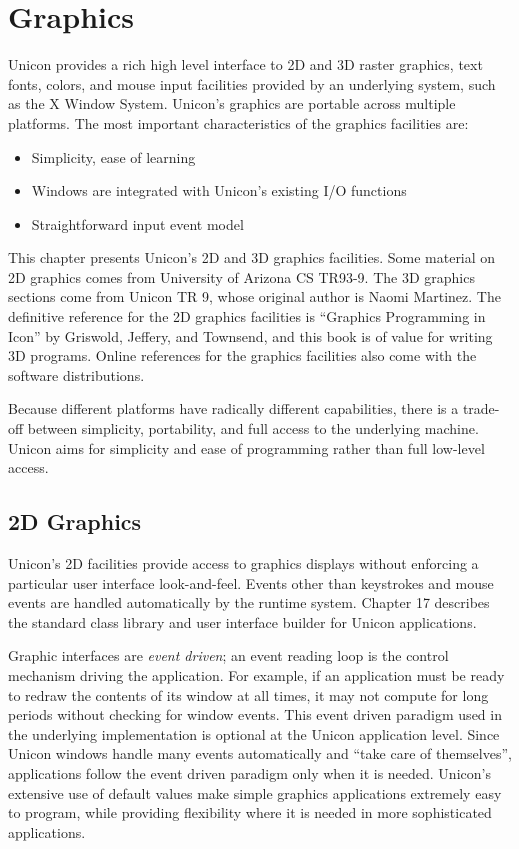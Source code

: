 \chapter{Graphics}

Unicon provides a rich high level interface to 2D and 3D raster
graphics, text fonts, colors, and mouse input facilities provided by
an underlying system, such as the X Window System.  Unicon's graphics
are portable across multiple platforms. The most important
characteristics of the graphics facilities are:
\begin{itemize}\itemsep0pt \item Simplicity, ease of learning \item
Windows are integrated with Unicon's existing I/O functions \item
Straightforward input event model \end{itemize} This chapter presents
Unicon's 2D and 3D graphics facilities.  Some material on 2D graphics
comes from University of Arizona CS TR93-9. The 3D graphics sections
come from Unicon TR 9, whose original author is Naomi Martinez. The
definitive reference for the 2D graphics facilities is ``Graphics
Programming in Icon'' by Griswold, Jeffery, and Townsend, and this
book is of value for writing 3D programs. Online references for the
graphics facilities also come with the software distributions.

Because different platforms have radically different capabilities,
there is a trade-off between simplicity, portability, and full access
to the underlying machine. Unicon aims for simplicity and ease of
programming rather than full low-level access.

\section{2D Graphics}

Unicon's 2D facilities provide access to graphics displays without
enforcing a particular user interface look-and-feel.  Events other
than keystrokes and mouse events are handled automatically by the
runtime system. Chapter 17 describes the standard class library and
user interface builder for Unicon applications.

Graphic interfaces are \emph{event driven}; an
event reading loop is the control mechanism driving the application.
For example, if an application must be ready to redraw the contents of
its window at all times, it may not compute for long periods without
checking for window events. This event driven paradigm used in the
underlying implementation is optional at the Unicon application
level. Since Unicon windows handle many events automatically and
``take care of themselves'', applications follow the event driven
paradigm only when it is needed.  Unicon's extensive use of default
values make simple graphics applications extremely easy to program,
while providing flexibility where it is needed in more sophisticated
applications.

